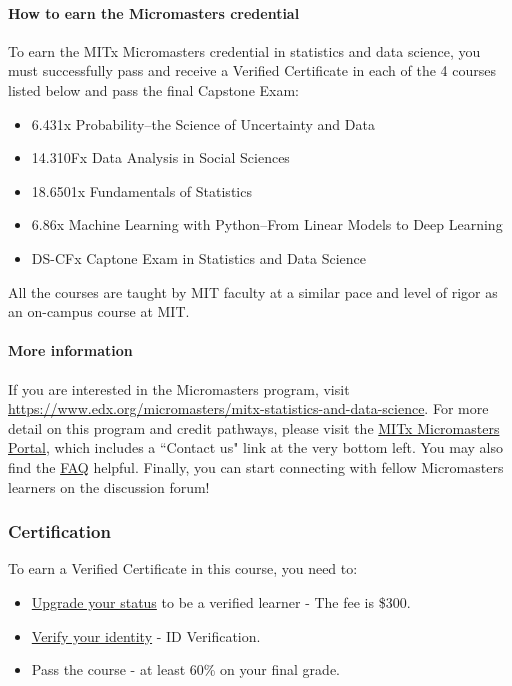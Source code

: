 \documentclass[pdftex, brazil, 12pt, twoside]{article}
\begin{document}
\paragraph{How to earn the Micromasters credential} To earn the MITx Micromasters
credential in statistics and data science, you must successfully pass and receive
a Verified Certificate in each of the 4 courses listed below and pass the final
Capstone Exam:

\begin{itemize}[noitemsep]
\item 6.431x Probability–the Science of Uncertainty and Data
\item 14.310Fx Data Analysis in Social Sciences
\item 18.6501x Fundamentals of Statistics
\item 6.86x Machine Learning with Python–From Linear Models to Deep Learning
\item DS-CFx Captone Exam in Statistics and Data Science 
\end{itemize}

All the courses are taught by MIT faculty at a similar pace and level of
rigor as an on-campus course at MIT.

\paragraph{More information} If you are interested in the Micromasters program,
visit \href{https://www.edx.org/micromasters/mitx-statistics-and-data-science}{https://www.edx.org/micromasters/mitx-statistics-and-data-science}.
For more detail on this program and credit pathways, please visit the \href{https://micromasters.mit.edu/ds}{MITx
  Micromasters Portal}, which includes a “Contact us" link at the very bottom left.
You may also find the \href{https://micromasters.mit.edu/ds/faq/}{FAQ} helpful.
Finally, you can start connecting with fellow
Micromasters learners on the discussion forum! 

\subsubsection{Certification}
\label{ovw0-mm-certification}

To earn a Verified Certificate in this course, you need to:

\begin{itemize}[noitemsep]
\item \href{https://courses.edx.org/verify_student/upgrade/course-v1:MITx+6.431x+3T2018/}{Upgrade your status}
  to be a verified learner - The fee is \$300.
\item \href{https://support.edx.org/hc/en-us/articles/206503858-Best-Practices-for-edX-Photo-Verification}{Verify your identity} - ID Verification.
\item Pass the course - at least 60\% on your final grade.
\end{itemize}
\end{document}
